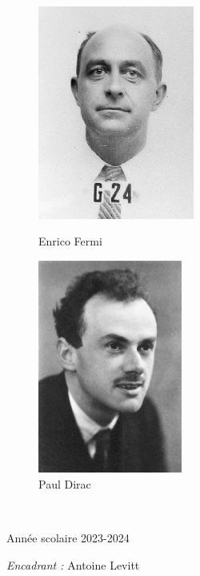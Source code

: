 \documentclass[12pt,openany,a4paper, titlepage]{article}
\theoremstyle{definition}
\theoremstyle{definition}
\theoremstyle{definition}
\theoremstyle{definition}
\theoremstyle{definition}
\theoremstyle{definition}
\begin{document}
\begin{titlepage}
\begin{sffamily}
\begin{center}
\begin{figure}[h]
    \begin{minipage}[c]{.5\linewidth}
    \centering
       \includegraphics[height=7cm]{Enrico_Fermi.png} 
        \caption{Enrico Fermi}
    \end{minipage} \hfill
    \begin{minipage}[c]{.5\linewidth}
    \centering
        \includegraphics[height=7cm]{Paul_Dirac.jpg}
        \caption{Paul Dirac}
    \end{minipage}
\end{figure}\\[2cm]

\begin{minipage}{0.4\textwidth}
\begin{flushleft} \large
Année scolaire 2023-2024
\end{flushleft}
\end{minipage}
\begin{minipage}{0.4\textwidth}
\begin{flushright} \large
\emph{Encadrant :} Antoine Levitt
\end{flushright}
\end{minipage}

\vfill



\end{center}
\end{sffamily}
\end{titlepage}
\end{document}
